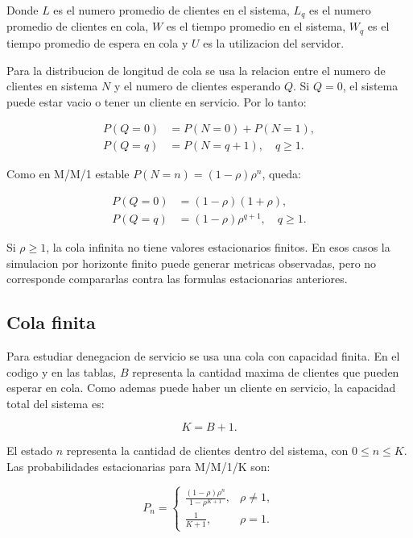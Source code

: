 Donde $L$ es el numero promedio de clientes en el sistema, $L_q$ es el numero promedio de clientes en cola, $W$ es el tiempo promedio en el sistema, $W_q$ es el tiempo promedio de espera en cola y $U$ es la utilizacion del servidor.

Para la distribucion de longitud de cola se usa la relacion entre el numero de clientes en sistema $N$ y el numero de clientes esperando $Q$. Si $Q=0$, el sistema puede estar vacio o tener un cliente en servicio. Por lo tanto:

\begin{align}
    P(Q=0) &= P(N=0) + P(N=1), \\
    P(Q=q) &= P(N=q+1), \quad q \geq 1.
\end{align}

Como en M/M/1 estable $P(N=n)=(1-\rho)\rho^n$, queda:

\begin{align}
    P(Q=0) &= (1-\rho)(1+\rho), \\
    P(Q=q) &= (1-\rho)\rho^{q+1}, \quad q \geq 1.
\end{align}

Si $\rho \geq 1$, la cola infinita no tiene valores estacionarios finitos. En esos casos la simulacion por horizonte finito puede generar metricas observadas, pero no corresponde compararlas contra las formulas estacionarias anteriores.

\subsection{Cola finita}

Para estudiar denegacion de servicio se usa una cola con capacidad finita. En el codigo y en las tablas, $B$ representa la cantidad maxima de clientes que pueden esperar en cola. Como ademas puede haber un cliente en servicio, la capacidad total del sistema es:

\begin{equation}
    K = B + 1.
\end{equation}

El estado $n$ representa la cantidad de clientes dentro del sistema, con $0 \leq n \leq K$. Las probabilidades estacionarias para M/M/1/K son:

\begin{equation}
    P_n =
    \begin{cases}
        \frac{(1-\rho)\rho^n}{1-\rho^{K+1}}, & \rho \neq 1, \\
        \frac{1}{K+1}, & \rho = 1.
    \end{cases}
\end{equation}

